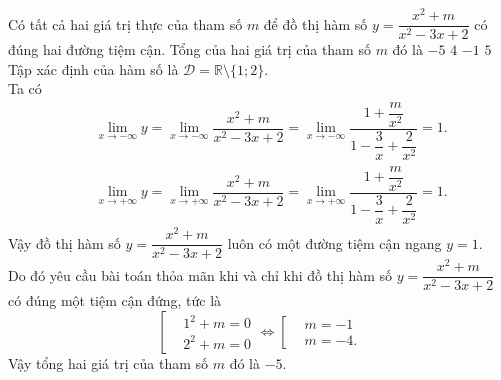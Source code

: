 \begin{ex}%
 Có tất cả hai giá trị thực của tham số $m$ để đồ thị hàm số $y=\dfrac{x^2+m}{x^2-3x+2}$ có đúng hai đường tiệm cận. Tổng của hai giá trị của tham số $m$ đó là
 \choice
  {\True $-5$}
  {$4$}
  {$-1$}
  {$5$}
 \loigiai
  {
  Tập xác định của hàm số là $\mathscr{D}=\mathbb{R}\setminus\{1;2\}$.\\
  Ta có
  \allowdisplaybreaks
  \begin{eqnarray*}
   && \lim\limits_{x\to -\infty}y= \lim\limits_{x\to -\infty}\dfrac{x^2+m}{x^2-3x+2} = \lim\limits_{x\to -\infty}\dfrac{1+\dfrac{m}{x^2}}{1-\dfrac{3}{x}+\dfrac{2}{x^2}} = 1.\\
   && \lim\limits_{x\to +\infty}y= \lim\limits_{x\to +\infty}\dfrac{x^2+m}{x^2-3x+2} = \lim\limits_{x\to +\infty}\dfrac{1+\dfrac{m}{x^2}}{1-\dfrac{3}{x}+\dfrac{2}{x^2}} = 1.
  \end{eqnarray*}
  Vậy đồ thị hàm số $y=\dfrac{x^2+m}{x^2-3x+2}$ luôn có một đường tiệm cận ngang $y=1$.\\
  Do đó yêu cầu bài toán thỏa mãn khi và chỉ khi đồ thị hàm số $y=\dfrac{x^2+m}{x^2-3x+2}$ có đúng một tiệm cận đứng, tức là
  \[\left[\begin{aligned}&1^2+m=0 \\&2^2+m=0\end{aligned}\right. \Leftrightarrow \left[\begin{aligned}&m=-1 \\&m=-4.\end{aligned}\right.\]
  Vậy tổng hai giá trị của tham số $m$ đó là $-5$.
  }
\end{ex}

